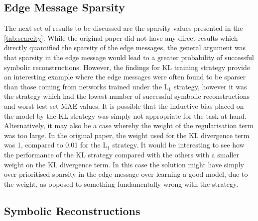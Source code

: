 \documentclass[11pt]{article}
\begin{document}
\subsection{Edge Message Sparsity}
The next set of results to be discussed are the sparsity values presented in the \ref{tab:scarcity}. While the original paper did not have any direct results which directly quantified the sparsity of the edge messages, the general argument was that sparsity in the edge message would lead to a greater probability of successful symbolic reconstructions. However, the findings for KL training strategy provide an interesting example where the edge messages were often found to be sparser than those coming from networks trained under the L$_{1}$ strategy, however it was the strategy which had the lowest number of successful symbolic reconstructions and worst test set MAE values. It is possible that the inductive bias placed on the model by the KL strategy was simply not appropriate for the task at hand. Alternatively, it may also be a case whereby the weight of the regularisation term was too large. In the original paper, the weight used for the KL divergence term was 1, compared to 0.01 for the L$_{1}$ strategy. It would be interesting to see how the performance of the KL strategy compared with the others with a smaller weight on the KL divergence term. In this case the solution might have simply over prioritised sparsity in the edge message over learning a good model, due to the weight, as opposed to something fundamentally wrong with the strategy. 
\subsection{Symbolic Reconstructions}
\end{document}
